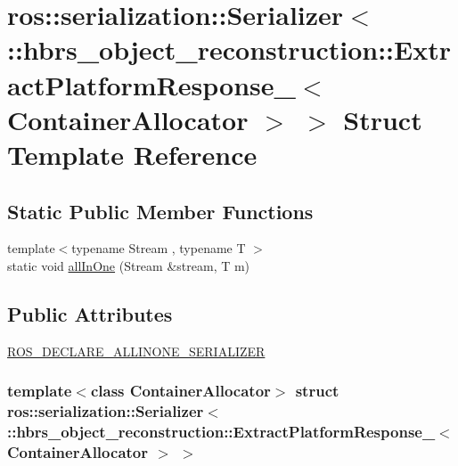 \hypertarget{structros_1_1serialization_1_1_serializer_3_01_1_1hbrs__object__reconstruction_1_1_extract_platfe22bf269b5082500956997a930b8e1a9}{\section{ros\-:\-:serialization\-:\-:\-Serializer$<$ \-:\-:hbrs\-\_\-object\-\_\-reconstruction\-:\-:\-Extract\-Platform\-Response\-\_\-$<$ \-Container\-Allocator $>$ $>$ \-Struct \-Template \-Reference}
\label{structros_1_1serialization_1_1_serializer_3_01_1_1hbrs__object__reconstruction_1_1_extract_platfe22bf269b5082500956997a930b8e1a9}
}
\subsection*{\-Static \-Public \-Member \-Functions}
\begin{DoxyCompactItemize}
\item 
{\footnotesize template$<$typename Stream , typename T $>$ }\\static void \hyperlink{structros_1_1serialization_1_1_serializer_3_01_1_1hbrs__object__reconstruction_1_1_extract_platfe22bf269b5082500956997a930b8e1a9_a6b9d4046aa1dc782f06ffedf8f17d19d}{all\-In\-One} (\-Stream \&stream, \-T m)
\end{DoxyCompactItemize}
\subsection*{\-Public \-Attributes}
\begin{DoxyCompactItemize}
\item 
\hyperlink{structros_1_1serialization_1_1_serializer_3_01_1_1hbrs__object__reconstruction_1_1_extract_platfe22bf269b5082500956997a930b8e1a9_aeb7f114494dff58ca5ca2fe8ec855082}{\-R\-O\-S\-\_\-\-D\-E\-C\-L\-A\-R\-E\-\_\-\-A\-L\-L\-I\-N\-O\-N\-E\-\_\-\-S\-E\-R\-I\-A\-L\-I\-Z\-E\-R}
\end{DoxyCompactItemize}
\subsubsection*{template$<$class Container\-Allocator$>$ struct ros\-::serialization\-::\-Serializer$<$ \-::hbrs\-\_\-object\-\_\-reconstruction\-::\-Extract\-Platform\-Response\-\_\-$<$ Container\-Allocator $>$ $>$}



